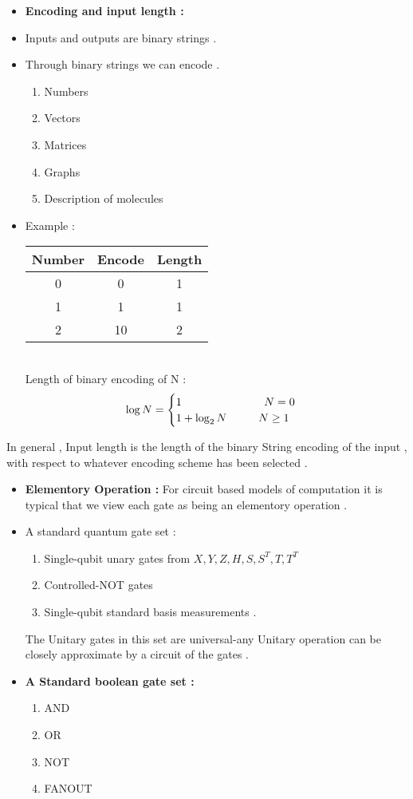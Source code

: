 \documentclass[12pt]{beamer}
\begin{document}
\begin{frame}
\begin{itemize}
\item\textbf{Encoding and input length :}
\item{Inputs and outputs are binary strings .}
\item{Through binary strings we can encode .}
\begin{enumerate}
\item{Numbers}
\item{Vectors}
\item{Matrices}
\item{Graphs}
\item{Description of molecules}
\end{enumerate}
\item{Example :}\\
\begin{tabular}{|c|c|c|}
\hline
Number & Encode & Length \\
\hline
0 & 0 & 1 \\
1 & 1 & 1 \\
2 & 10 & 2 \\
\hline
\end{tabular}
\\Length of binary encoding of N :
\[
\log{N}=
\begin{cases}
1\hspace{2.6cm}N=0\\
1+\log_{2}{N}\hspace{1cm}N\geq1
\end{cases}
\]
\end{itemize}
\end{frame}
\begin{frame}
In general , Input length is the length of the binary String encoding of the input , with respect to whatever encoding scheme has been selected .
\begin{itemize}
\item\textbf{Elementory Operation :}
For circuit based models of computation it is typical that we view each gate as being an elementory operation .
\item{A standard quantum gate set :}
\begin{enumerate}
\item{Single-qubit unary gates from \(X,Y,Z,H,S,S^T,T,T^T\)}
\item{Controlled-NOT gates}
\item{Single-qubit standard basis measurements .}
\end{enumerate}
The Unitary gates in this set are universal-any Unitary operation can be closely approximate by a circuit of the gates .
\item\textbf{A Standard boolean gate set :}
\begin{enumerate}
\item{AND}
\item{OR}
\item{NOT}
\item{FANOUT}
\end{enumerate}
\end{itemize}
\end{frame}
\end{document}
